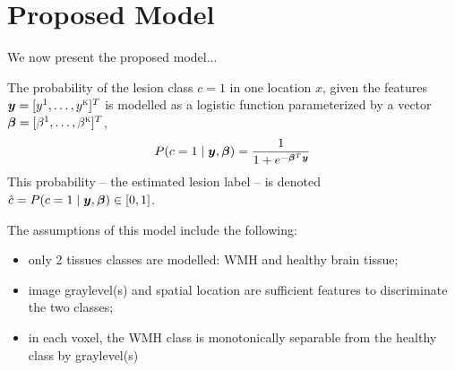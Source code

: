\section{Proposed Model}
We now present the proposed model...
\par
The probability of the lesion class $c=1$ in one location $x$, given the features $\bm{y} = [y^1,\dots,y^{\textsc{k}}]^T$  is modelled as a logistic function parameterized by a vector $\bm{\beta} = [\beta^1,\dots,\beta^{\textsc{k}}]^T$,
\begin{equation}
  P(c=1\mid\bm{y},\bm{\beta}) = \frac{1}{1+e^{-\bm{\beta}^T\bm{y}}}
  \label{eq:model}
\end{equation}
This probability -- the estimated lesion label -- is denoted $\hat{c} = P(c=1\mid\bm{y},\bm{\beta}) \in [0,1]$.
\par
The assumptions of this model include the following:
\begin{itemize}[itemsep=0pt]
  \item only 2 tissues classes are modelled: WMH and healthy brain tissue;
  \item image graylevel(s) and spatial location are sufficient features to discriminate the two classes;
  \item in each voxel, the WMH class is monotonically separable from the healthy class by graylevel(s)
\end{itemize}
